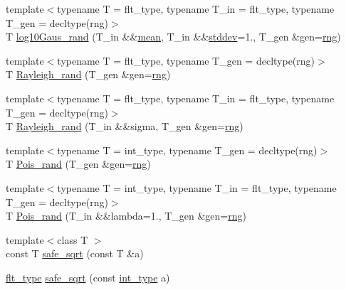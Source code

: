 \begin{DoxyCompactItemize}
\item 
{\footnotesize template$<$typename T  = flt\+\_\+type, typename T\+\_\+in  = flt\+\_\+type, typename T\+\_\+gen  = decltype(rng)$>$ }\\T \hyperlink{namespaceIceBRG_a1bc93f595f23f7e31e7a2b8a721a9d64}{log10\+Gaus\+\_\+rand} (T\+\_\+in \&\&\hyperlink{namespaceIceBRG_a31912d66a78938bcc3e0fdbc917c5eec}{mean}, T\+\_\+in \&\&\hyperlink{namespaceIceBRG_a9db49a32658ae04d4e5780e90c58ae15}{stddev}=1., T\+\_\+gen \&gen=\hyperlink{namespaceIceBRG_a43349d2fe56e49b46f2da45c2472137d}{rng})
\item 
{\footnotesize template$<$typename T  = flt\+\_\+type, typename T\+\_\+gen  = decltype(rng)$>$ }\\T \hyperlink{namespaceIceBRG_ad5beaf7f31c4ecdbabf5c1f1fa0f7f6b}{Rayleigh\+\_\+rand} (T\+\_\+gen \&gen=\hyperlink{namespaceIceBRG_a43349d2fe56e49b46f2da45c2472137d}{rng})
\item 
{\footnotesize template$<$typename T  = flt\+\_\+type, typename T\+\_\+in  = flt\+\_\+type, typename T\+\_\+gen  = decltype(rng)$>$ }\\T \hyperlink{namespaceIceBRG_a9fab2dcec2635a4e59ba071c32da779d}{Rayleigh\+\_\+rand} (T\+\_\+in \&\&sigma, T\+\_\+gen \&gen=\hyperlink{namespaceIceBRG_a43349d2fe56e49b46f2da45c2472137d}{rng})
\item 
{\footnotesize template$<$typename T  = int\+\_\+type, typename T\+\_\+gen  = decltype(rng)$>$ }\\T \hyperlink{namespaceIceBRG_a1c9e722659890cce624c4ce86284b114}{Pois\+\_\+rand} (T\+\_\+gen \&gen=\hyperlink{namespaceIceBRG_a43349d2fe56e49b46f2da45c2472137d}{rng})
\item 
{\footnotesize template$<$typename T  = int\+\_\+type, typename T\+\_\+in  = flt\+\_\+type, typename T\+\_\+gen  = decltype(rng)$>$ }\\T \hyperlink{namespaceIceBRG_a37cc4f8621b4da03b565610c6849aa25}{Pois\+\_\+rand} (T\+\_\+in \&\&lambda=1., T\+\_\+gen \&gen=\hyperlink{namespaceIceBRG_a43349d2fe56e49b46f2da45c2472137d}{rng})
\item 
{\footnotesize template$<$class T $>$ }\\const T \hyperlink{namespaceIceBRG_ad03a73cb47a7f99aa7bef24b52f72d61}{safe\+\_\+sqrt} (const T \&a)
\item 
\hyperlink{lib_2IceBRG__main_2common_8h_ad0f130a56eeb944d9ef2692ee881ecc4}{flt\+\_\+type} \hyperlink{namespaceIceBRG_ae33e2111d94e17405d5b736a7ac159cd}{safe\+\_\+sqrt} (const \hyperlink{lib_2IceBRG__main_2common_8h_ac4de9d9335536ac22821171deec8d39e}{int\+\_\+type} a)

\end{DoxyCompactItemize}
